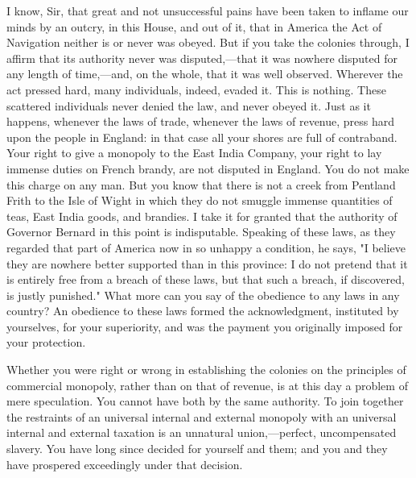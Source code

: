 I know, Sir, that great and not unsuccessful pains have been taken to inflame our minds by an outcry, in this House, and out of it, that in America the Act of Navigation neither is or never was obeyed. But if you take the colonies through, I affirm that its authority never was disputed,—that it was nowhere disputed for any length of time,—and, on the whole, that it was well observed. Wherever the act pressed hard, many individuals, indeed, evaded it. This is nothing. These scattered individuals never denied the law, and never obeyed it. Just as it happens, whenever the laws of trade, whenever the laws of revenue, press hard upon the people in England: in that case all your shores are full of contraband. Your right to give a monopoly to the East India Company, your right to lay immense duties on French brandy, are not disputed in England. You do not make this charge on any man. But you know that there is not a creek from Pentland Frith to the Isle of Wight in which they do not smuggle immense quantities of teas, East India goods, and brandies. I take it for granted that the authority of Governor Bernard in this point is indisputable. Speaking of these laws, as they regarded that part of America now in so unhappy a condition, he says, "I believe they are nowhere better supported than in this province: I do not pretend that it is entirely free from a breach of these laws, but that such a breach, if discovered, is justly punished." What more can you say of the obedience to any laws in any country? An obedience to these laws formed the acknowledgment, instituted by yourselves, for your superiority, and was the payment you originally imposed for your protection.

Whether you were right or wrong in establishing the colonies on the principles of commercial monopoly, rather than on that of revenue, is at this day a problem of mere speculation. You cannot have both by the same authority. To join together the restraints of an universal internal and external monopoly with an universal internal and external taxation is an unnatural union,—perfect, uncompensated slavery. You have long since decided for yourself and them; and you and they have prospered exceedingly under that decision.

